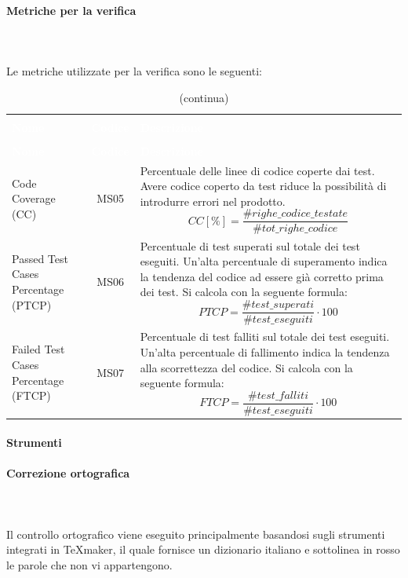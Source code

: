 \paragraph{Metriche per la verifica} \mbox{} \\ \mbox{} \\
Le metriche utilizzate per la verifica sono le seguenti:
\begin{longtable}{ C{4.5cm} c L{9.5cm} }
	\caption{Metriche per la verifica}\\
		\textcolor{white}{\textbf{Nome}} & \textcolor{white}{\textbf{Codice}} & \centerline{\textcolor{white}{\textbf{Descrizione}}} \\
		\endfirsthead
		\caption[]{(continua)} \\
		\textcolor{white}{\textbf{Nome}} & \textcolor{white}{\textbf{Codice}} & \centerline{\textcolor{white}{\textbf{Descrizione}}} \\
		\endhead
		Code Coverage (CC) & MS05 & Percentuale delle linee di codice coperte dai test. Avere codice coperto da test riduce la possibilità di introdurre errori nel prodotto. 
		\[ CC[\%] = \frac{\#righe\_codice\_testate}{\#tot\_righe\_codice}\] \\
		Passed Test Cases Percentage (PTCP) & MS06 & Percentuale di test superati sul totale dei test eseguiti. Un'alta percentuale di superamento indica la tendenza del codice ad essere già corretto prima dei test. Si calcola con la seguente
formula:
		\[ PTCP = \frac{\#test\_superati}{\#test\_eseguiti}\cdot 100 \] \\
		Failed Test Cases Percentage (FTCP) & MS07 & Percentuale di test falliti sul totale dei test eseguiti. Un'alta percentuale di fallimento indica la tendenza
alla scorrettezza del codice. Si calcola con la seguente formula:
\[ FTCP = \frac{\#test\_falliti}{\#test\_eseguiti}\cdot 100 \] \\
\end{longtable}

\paragraph{Strumenti}

\paragraph*{Correzione ortografica} \mbox{} \\ \mbox{} \\
Il controllo ortografico viene eseguito principalmente basandosi sugli strumenti integrati in \TeX{}maker, il quale fornisce un dizionario italiano e sottolinea in rosso le parole che non vi appartengono. 
\
